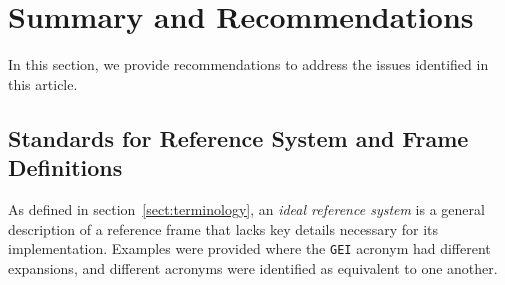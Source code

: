 \documentclass[draft]{agujournal2019}
\begin{document}







\section{Summary and Recommendations}
\label{sect:conclusions}


In this section, we provide recommendations to address the issues identified in this article.

\subsection{Standards for Reference System and Frame Definitions}
\label{sect:standard-for}

As defined in section~\ref {sect:terminology}, an {\it ideal reference system} is a general description of a reference frame that lacks key details necessary for its implementation. Examples were provided where the \texttt{GEI} acronym had different expansions, and different acronyms were identified as equivalent to one another.
  
\end{document}
